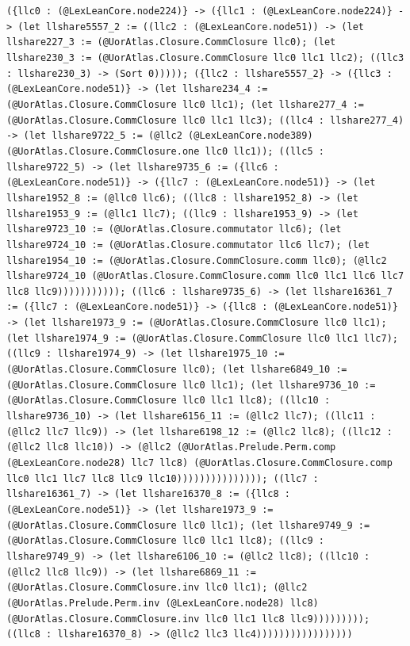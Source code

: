 \documentclass[11pt]{article}
\begin{document}
\noindent\texttt{(\{llc0 : (@LexLeanCore.node224)\} -> (\{llc1 : (@LexLeanCore.node224)\} -> (let llshare5557\_2 := ((llc2 : (@LexLeanCore.node51)) -> (let llshare227\_3 := (@UorAtlas.Closure.CommClosure llc0); (let llshare230\_3 := (@UorAtlas.Closure.CommClosure llc0 llc1 llc2); ((llc3 : llshare230\_3) -> (Sort 0))))); (\{llc2 : llshare5557\_2\} -> (\{llc3 : (@LexLeanCore.node51)\} -> (let llshare234\_4 := (@UorAtlas.Closure.CommClosure llc0 llc1); (let llshare277\_4 := (@UorAtlas.Closure.CommClosure llc0 llc1 llc3); ((llc4 : llshare277\_4) -> (let llshare9722\_5 := (@llc2 (@LexLeanCore.node389) (@UorAtlas.Closure.CommClosure.one llc0 llc1)); ((llc5 : llshare9722\_5) -> (let llshare9735\_6 := (\{llc6 : (@LexLeanCore.node51)\} -> (\{llc7 : (@LexLeanCore.node51)\} -> (let llshare1952\_8 := (@llc0 llc6); ((llc8 : llshare1952\_8) -> (let llshare1953\_9 := (@llc1 llc7); ((llc9 : llshare1953\_9) -> (let llshare9723\_10 := (@UorAtlas.Closure.commutator llc6); (let llshare9724\_10 := (@UorAtlas.Closure.commutator llc6 llc7); (let llshare1954\_10 := (@UorAtlas.Closure.CommClosure.comm llc0); (@llc2 llshare9724\_10 (@UorAtlas.Closure.CommClosure.comm llc0 llc1 llc6 llc7 llc8 llc9))))))))))); ((llc6 : llshare9735\_6) -> (let llshare16361\_7 := (\{llc7 : (@LexLeanCore.node51)\} -> (\{llc8 : (@LexLeanCore.node51)\} -> (let llshare1973\_9 := (@UorAtlas.Closure.CommClosure llc0 llc1); (let llshare1974\_9 := (@UorAtlas.Closure.CommClosure llc0 llc1 llc7); ((llc9 : llshare1974\_9) -> (let llshare1975\_10 := (@UorAtlas.Closure.CommClosure llc0); (let llshare6849\_10 := (@UorAtlas.Closure.CommClosure llc0 llc1); (let llshare9736\_10 := (@UorAtlas.Closure.CommClosure llc0 llc1 llc8); ((llc10 : llshare9736\_10) -> (let llshare6156\_11 := (@llc2 llc7); ((llc11 : (@llc2 llc7 llc9)) -> (let llshare6198\_12 := (@llc2 llc8); ((llc12 : (@llc2 llc8 llc10)) -> (@llc2 (@UorAtlas.Prelude.Perm.comp (@LexLeanCore.node28) llc7 llc8) (@UorAtlas.Closure.CommClosure.comp llc0 llc1 llc7 llc8 llc9 llc10))))))))))))))); ((llc7 : llshare16361\_7) -> (let llshare16370\_8 := (\{llc8 : (@LexLeanCore.node51)\} -> (let llshare1973\_9 := (@UorAtlas.Closure.CommClosure llc0 llc1); (let llshare9749\_9 := (@UorAtlas.Closure.CommClosure llc0 llc1 llc8); ((llc9 : llshare9749\_9) -> (let llshare6106\_10 := (@llc2 llc8); ((llc10 : (@llc2 llc8 llc9)) -> (let llshare6869\_11 := (@UorAtlas.Closure.CommClosure.inv llc0 llc1); (@llc2 (@UorAtlas.Prelude.Perm.inv (@LexLeanCore.node28) llc8) (@UorAtlas.Closure.CommClosure.inv llc0 llc1 llc8 llc9))))))))); ((llc8 : llshare16370\_8) -> (@llc2 llc3 llc4)))))))))))))))))}\par
\end{document}
